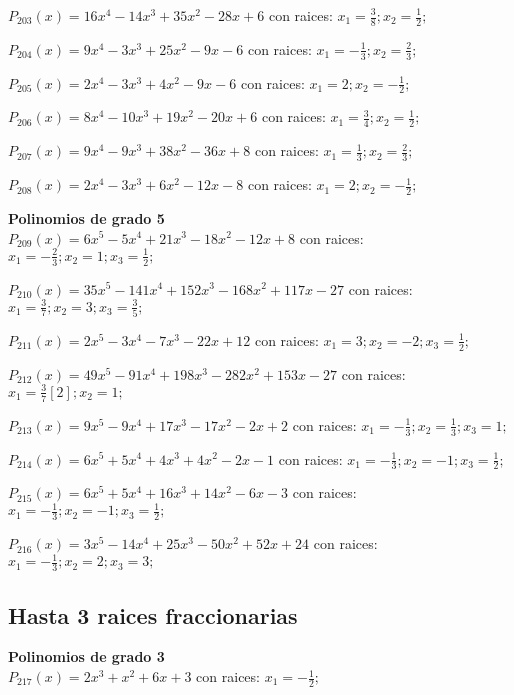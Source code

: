 \subitem $P_{203}(x) = 16x^4 - 14x^3 + 35x^2 - 28x + 6$ con raices: $x_1 = \frac{3}{8} ; x_2 = \frac{1}{2} ;  $

\subitem $P_{204}(x) = 9x^4 - 3x^3 + 25x^2 - 9x - 6$ con raices: $x_1 = -\frac{1}{3} ; x_2 = \frac{2}{3} ;  $

\subitem $P_{205}(x) = 2x^4 - 3x^3 + 4x^2 - 9x - 6$ con raices: $x_1 = 2 ; x_2 = -\frac{1}{2} ;  $

\subitem $P_{206}(x) = 8x^4 - 10x^3 + 19x^2 - 20x + 6$ con raices: $x_1 = \frac{3}{4} ; x_2 = \frac{1}{2} ;  $

\subitem $P_{207}(x) = 9x^4 - 9x^3 + 38x^2 - 36x + 8$ con raices: $x_1 = \frac{1}{3} ; x_2 = \frac{2}{3} ;  $

\subitem $P_{208}(x) = 2x^4 - 3x^3 + 6x^2 - 12x - 8$ con raices: $x_1 = 2 ; x_2 = -\frac{1}{2} ;  $

\textbf{Polinomios de grado 5\\} 
\subitem $P_{209}(x) = 6x^5 - 5x^4 + 21x^3 - 18x^2 - 12x + 8$ con raices: $x_1 = -\frac{2}{3} ; x_2 = 1 ; x_3 = \frac{1}{2} ;  $

\subitem $P_{210}(x) = 35x^5 - 141x^4 + 152x^3 - 168x^2 + 117x - 27$ con raices: $x_1 = \frac{3}{7} ; x_2 = 3 ; x_3 = \frac{3}{5} ;  $

\subitem $P_{211}(x) = 2x^5 - 3x^4 - 7x^3 - 22x + 12$ con raices: $x_1 = 3 ; x_2 = -2 ; x_3 = \frac{1}{2} ;  $

\subitem $P_{212}(x) = 49x^5 - 91x^4 + 198x^3 - 282x^2 + 153x - 27$ con raices: $x_1 = \frac{3}{7}[2] ; x_2 = 1 ;  $

\subitem $P_{213}(x) = 9x^5 - 9x^4 + 17x^3 - 17x^2 - 2x + 2$ con raices: $x_1 = -\frac{1}{3} ; x_2 = \frac{1}{3} ; x_3 = 1 ;  $

\subitem $P_{214}(x) = 6x^5 + 5x^4 + 4x^3 + 4x^2 - 2x - 1$ con raices: $x_1 = -\frac{1}{3} ; x_2 = -1 ; x_3 = \frac{1}{2} ;  $

\subitem $P_{215}(x) = 6x^5 + 5x^4 + 16x^3 + 14x^2 - 6x - 3$ con raices: $x_1 = -\frac{1}{3} ; x_2 = -1 ; x_3 = \frac{1}{2} ;  $

\subitem $P_{216}(x) = 3x^5 - 14x^4 + 25x^3 - 50x^2 + 52x + 24$ con raices: $x_1 = -\frac{1}{3} ; x_2 = 2 ; x_3 = 3 ;  $

\subsection{Hasta 3 raices fraccionarias}
\textbf{Polinomios de grado 3\\} 
\subitem $P_{217}(x) = 2x^3 + x^2 + 6x + 3$ con raices: $x_1 = -\frac{1}{2} ;  $

